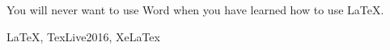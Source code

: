 
\noindent You will never want to use Word when you have learned how to use \LaTeX.

\vspace{\baselineskip}
 \LaTeX, TexLive2016, XeLaTex

\vspace{\baselineskip}

\titlespacing{\chapter}{0pt}{-5.3mm}{4.2mm}
\clearpage
